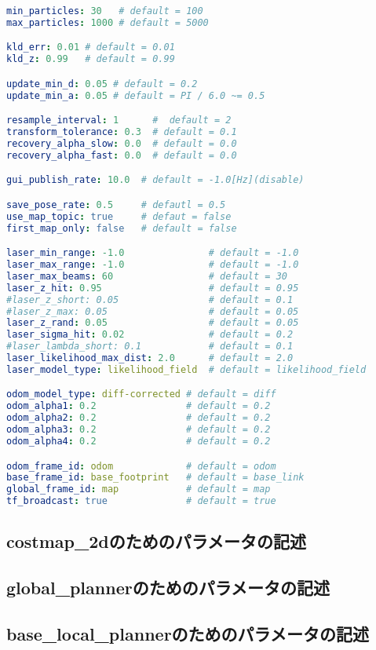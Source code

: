 \documentclass[{../../master}]{subfiles}
\begin{document}
\begin{lstlisting}[language=YAML, label=code:amcl_yml, caption=\textsf{amcl.yml}]
min_particles: 30   # default = 100
max_particles: 1000 # default = 5000

kld_err: 0.01 # default = 0.01
kld_z: 0.99   # default = 0.99

update_min_d: 0.05 # default = 0.2
update_min_a: 0.05 # default = PI / 6.0 ~= 0.5

resample_interval: 1      #  default = 2
transform_tolerance: 0.3  # default = 0.1
recovery_alpha_slow: 0.0  # default = 0.0
recovery_alpha_fast: 0.0  # default = 0.0

gui_publish_rate: 10.0  # default = -1.0[Hz](disable)

save_pose_rate: 0.5     # defautl = 0.5
use_map_topic: true     # defaut = false
first_map_only: false   # default = false

laser_min_range: -1.0               # default = -1.0
laser_max_range: -1.0               # default = -1.0
laser_max_beams: 60                 # default = 30
laser_z_hit: 0.95                   # default = 0.95
#laser_z_short: 0.05                # default = 0.1
#laser_z_max: 0.05                  # default = 0.05
laser_z_rand: 0.05                  # default = 0.05
laser_sigma_hit: 0.02               # default = 0.2
#laser_lambda_short: 0.1            # default = 0.1
laser_likelihood_max_dist: 2.0      # default = 2.0
laser_model_type: likelihood_field  # default = likelihood_field

odom_model_type: diff-corrected # default = diff
odom_alpha1: 0.2                # default = 0.2
odom_alpha2: 0.2                # default = 0.2
odom_alpha3: 0.2                # default = 0.2
odom_alpha4: 0.2                # default = 0.2

odom_frame_id: odom             # default = odom
base_frame_id: base_footprint   # default = base_link
global_frame_id: map            # default = map
tf_broadcast: true              # default = true
\end{lstlisting}

\subsection{\textsf{costmap\_2d}のためのパラメータの記述}

\subsection{\textsf{global\_planner}のためのパラメータの記述}

\subsection{\textsf{base\_local\_planner}のためのパラメータの記述}
\end{document}
